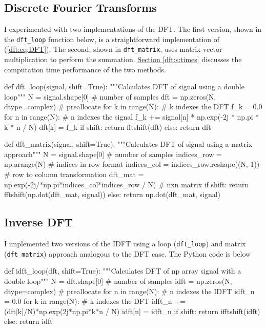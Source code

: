 \documentclass[11pt, a4paper]{article}
\begin{document}
\subsection{Discrete Fourier Transforms} \label{dft:ss:dft-algorithms}
I experimented with two implementations of the DFT. The first version, shown in the \texttt{dft\_loop} function below, is a straightforward implementation of (\ref{dft:eq:DFT}). The second, shown in \texttt{dft\_matrix}, uses matrix-vector multiplication to perform the summation. \hyperref[dft:s:times]{Section \ref{dft:s:times}} discusses the computation time performance of the two methods.
\begin{python}
def dft_loop(signal, shift=True):
    """Calculates DFT of signal using a double loop"""
    N = signal.shape[0]  # number of samples
    dft = np.zeros(N, dtype=complex)  # preallocate
    for k in range(N):  # k indexes the DFT
        f_k = 0.0
        for n in range(N):  # n indexes the signal
            f_k += signal[n] * np.exp(-2j * np.pi * k * n / N)
        dft[k] = f_k
    if shift: return fftshift(dft)
    else: return dft
\end{python}

\begin{python}
def dft_matrix(signal, shift=True):
    """Calculates DFT of signal using a matrix approach"""
    N = signal.shape[0]  # number of samples
    indices_row = np.arange(N)  # indices in row format
    indices_col = indices_row.reshape((N, 1))  # row to column transformation
    dft_mat = np.exp(-2j/*np.pi*indices_col*indices_row / N)  # nxn matrix
    if shift: return fftshift(np.dot(dft_mat, signal))
    else: return np.dot(dft_mat, signal)
\end{python}


\subsection{Inverse DFT}
I implemented two versions of the IDFT using a loop (\texttt{dft\_loop}) and matrix (\texttt{dft\_matrix}) approach analogous to the DFT case. The Python code is below
\begin{python}
def idft_loop(dft, shift=True):
    """Calculates DFT of np array signal with a double loop"""
    N = dft.shape[0]  # number of samples
    idft = np.zeros(N, dtype=complex)  # preallocate
    for n in range(N):  # n indexes the IDFT
        idft_n = 0.0
        for k in range(N):  # k indexes the DFT
            idft_n += (dft[k]/N)*np.exp(2j*np.pi*k*n / N)
        idft[n] = idft_n
    if shift: return ifftshift(idft)
    else: return idft
\end{python}
\end{document}
